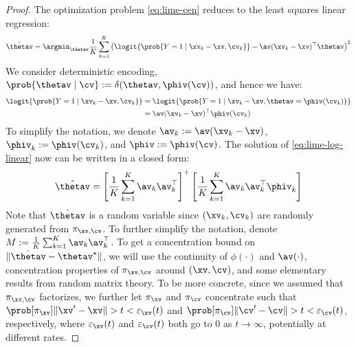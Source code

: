 \documentclass[twoside,11pt]{article}
\begin{document}
\vspace{1ex}
\begin{proof}
The optimization problem \eqref{eq:lime-cen} reduces to the least squares linear regression:
\begin{equation}
    \label{eq:lime-log-linear}
    \hat\thetav = \argmin_{\thetav} \frac{1}{K} \sum_{k=1}^K \left(\logit{\prob{Y = 1 \mid \xv_k - \xv, \cv_k}} - \av(\xv_k - \xv)^\top \thetav\right)^2
\end{equation}
We consider deterministic encoding, $\prob{\thetav \mid \cv} := \delta(\thetav, \phiv(\cv))$, and hence we have:
\begin{equation}
    \begin{split}
        \logit{\prob{Y = 1 \mid \xv_k - \xv, \cv_k}}
        & = \logit{\prob{Y = 1 \mid \xv_k - \xv, \thetav = \phiv(\cv_k)}} \\
        & = \av(\xv_k - \xv)^\top \phiv(\cv_k)
    \end{split}
\end{equation}
To simplify the notation, we denote $\av_k := \av(\xv_k - \xv)$, $\phiv_k := \phiv(\cv_k)$, and $\phiv := \phiv(\cv)$.
The solution of \eqref{eq:lime-log-linear} now can be written in a closed form:
\begin{equation}
    \hat\thetav = \left[\frac{1}{K} \sum_{k=1}^K \av_k \av_k^\top\right]^{+} \left[\frac{1}{K} \sum_{k=1}^K \av_k \av_k^\top \phiv_k\right]
\end{equation}
Note that $\hat\thetav$ is a random variable since $(\xv_k, \cv_k)$ are randomly generated from $\pi_{\xv, \cv}$.
To further simplify the notation, denote $M := \frac{1}{K} \sum_{k=1}^K \av_k \av_k^\top$.
To get a concentration bound on $\|\hat\thetav - \thetav^\star\|$, we will use the continuity of $\phi(\cdot)$ and $\av(\cdot)$, concentration properties of $\pi_{\xv, \cv}$ around $(\xv, \cv)$, and some elementary results from random matrix theory.
To be more concrete, since we assumed that $\pi_{\xv,\cv}$ factorizes, we further let $\pi_\xv$ and $\pi_\cv$ concentrate such that $\prob[\pi_{\xv}]{\|\xv^\prime - \xv\| > t} < \varepsilon_{\xv}(t)$ and $\prob[\pi_{\cv}]{\|\cv^\prime - \cv\| > t} < \varepsilon_{\cv}(t)$, respectively, where $\varepsilon_{\xv}(t)$ and $\varepsilon_{\cv}(t)$ both go to 0 as $t \rightarrow \infty$, potentially at different rates.


\end{proof}
\end{document}
